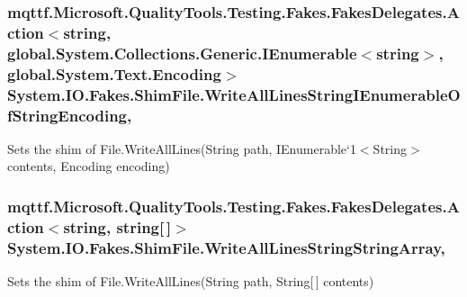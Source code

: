 \hypertarget{class_system_1_1_i_o_1_1_fakes_1_1_shim_file_aa77d2d80fe056089736b4318a5973624}{
\subsubsection[{Write\-All\-Lines\-String\-I\-Enumerable\-Of\-String\-Encoding}]{\setlength{\rightskip}{0pt plus 5cm}mqttf.\-Microsoft.\-Quality\-Tools.\-Testing.\-Fakes.\-Fakes\-Delegates.\-Action$<$string, global.\-System.\-Collections.\-Generic.\-I\-Enumerable$<$string$>$, global.\-System.\-Text.\-Encoding$>$ System.\-I\-O.\-Fakes.\-Shim\-File.\-Write\-All\-Lines\-String\-I\-Enumerable\-Of\-String\-Encoding\hspace{0.3cm}{\ttfamily [static]}, {\ttfamily [set]}}}\label{class_system_1_1_i_o_1_1_fakes_1_1_shim_file_aa77d2d80fe056089736b4318a5973624}


Sets the shim of File.\-Write\-All\-Lines(String path, I\-Enumerable`1$<$String$>$ contents, Encoding encoding)

\hypertarget{class_system_1_1_i_o_1_1_fakes_1_1_shim_file_af467c6e511f6f8a9be1a62ddb7cbcbd3}{
\subsubsection[{Write\-All\-Lines\-String\-String\-Array}]{\setlength{\rightskip}{0pt plus 5cm}mqttf.\-Microsoft.\-Quality\-Tools.\-Testing.\-Fakes.\-Fakes\-Delegates.\-Action$<$string, string\mbox{[}$\,$\mbox{]}$>$ System.\-I\-O.\-Fakes.\-Shim\-File.\-Write\-All\-Lines\-String\-String\-Array\hspace{0.3cm}{\ttfamily [static]}, {\ttfamily [set]}}}\label{class_system_1_1_i_o_1_1_fakes_1_1_shim_file_af467c6e511f6f8a9be1a62ddb7cbcbd3}


Sets the shim of File.\-Write\-All\-Lines(\-String path, String\mbox{[}$\,$\mbox{]} contents)

